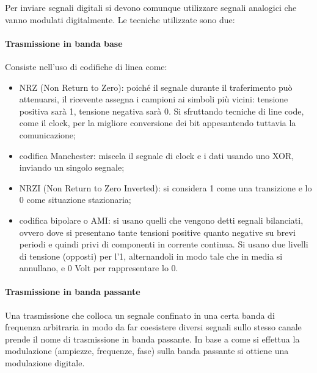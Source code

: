 \documentclass{subfiles}
\begin{document}
    Per inviare segnali digitali si devono comunque utilizzare segnali analogici che vanno modulati digitalmente. Le tecniche utilizzate 
    sono due:

    \paragraph*{Trasmissione in banda base}
    Consiste nell'uso di codifiche di linea come:
    \begin{itemize}
        \item NRZ (Non Return to Zero): poiché il segnale durante il traferimento può attenuarsi, il ricevente assegna i campioni ai 
        simboli più vicini: tensione positiva sarà 1, tensione negativa sarà 0. Si sfruttando tecniche di line code, come il clock, per 
        la migliore conversione dei bit appesantendo tuttavia la comunicazione;
        \item codifica Manchester: miscela il segnale di clock e i dati usando uno XOR, inviando un singolo segnale;
        \item NRZI (Non Return to Zero Inverted): si considera 1 come una transizione e lo 0 come situazione stazionaria;
        \item codifica bipolare o AMI: si usano quelli che vengono detti segnali bilanciati, ovvero dove si presentano tante tensioni 
        positive quanto negative su brevi periodi e quindi privi di componenti in corrente continua. Si usano due livelli di tensione 
        (opposti) per l'1, alternandoli in modo tale che in media si annullano, e 0 Volt per rappresentare lo 0.
    \end{itemize}

    \paragraph*{Trasmissione in banda passante}
    Una trasmissione che colloca un segnale confinato in una certa banda di frequenza arbitraria in modo da far coesistere diversi 
    segnali sullo stesso canale prende il nome di trasmissione in banda passante. In base a come si effettua la modulazione (ampiezze, 
    frequenze, fase) sulla banda passante si ottiene una modulazione digitale.
\end{document}
